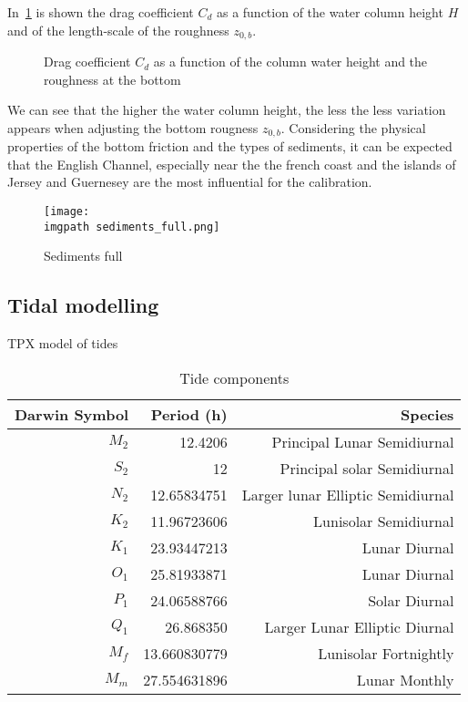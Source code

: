 \documentclass[../../Main_ManuscritThese.tex]{subfiles}
\newcommand{\zob}{z_{0,b}}
\newcommand\imgpath{/home/victor/acadwriting/Manuscrit/Text/Chapter5/img/}
\begin{document}
In~\cref{fig:cd_zob} is shown the drag coefficient $C_d$ as a function of the water column height $H$ and of the length-scale of the roughness $\zob$.
\begin{figure}[ht]
  \centering
  
  \caption{\label{fig:cd_zob} Drag coefficient $C_d$ as a function of the column water height and the roughness at the bottom}
\end{figure}
We can see that the higher the water column height, the less the less variation appears when adjusting the bottom rougness $\zob$.
Considering the physical properties of the bottom friction and the types of sediments, it can be expected that the English Channel, especially near the the french coast and the islands of Jersey and Guernesey are the most influential for the calibration.


\begin{figure}[ht]
  \centering
  \texttt{[image: \\imgpath sediments\_full.png]}
  \caption{\label{fig:sediments_full} Sediments full}
\end{figure}

\subsection{Tidal modelling}
\cite{egbert_efficient_2002} TPX model of tides

\label{sec:tidal_modelling}
\begin{table}[!h]
  \centering %
  \begin{tabular}{rrr}\toprule
    Darwin Symbol & Period (h) & Species \\ \midrule
    $M_2$& 12.4206 & Principal Lunar Semidiurnal \\
    $S_2$& 12 & Principal solar Semidiurnal \\
    $N_2$& 12.65834751& Larger lunar Elliptic Semidiurnal  \\
    $K_2$& 11.96723606  & Lunisolar Semidiurnal \\
    $K_1$& 23.93447213  & Lunar Diurnal \\\midrule
    $O_1$& 25.81933871 & Lunar Diurnal \\ 
    $P_1$& 24.06588766 & Solar Diurnal\\
    $Q_1$& 26.868350 & Larger Lunar Elliptic Diurnal \\
    $M_f$& 13.660830779 & Lunisolar Fortnightly  \\
    $M_m$& 27.554631896 & Lunar Monthly  \\
    \bottomrule
  \end{tabular}
  \caption{Tide components}
  \label{tab:tides_components}
\end{table}
\end{document}
